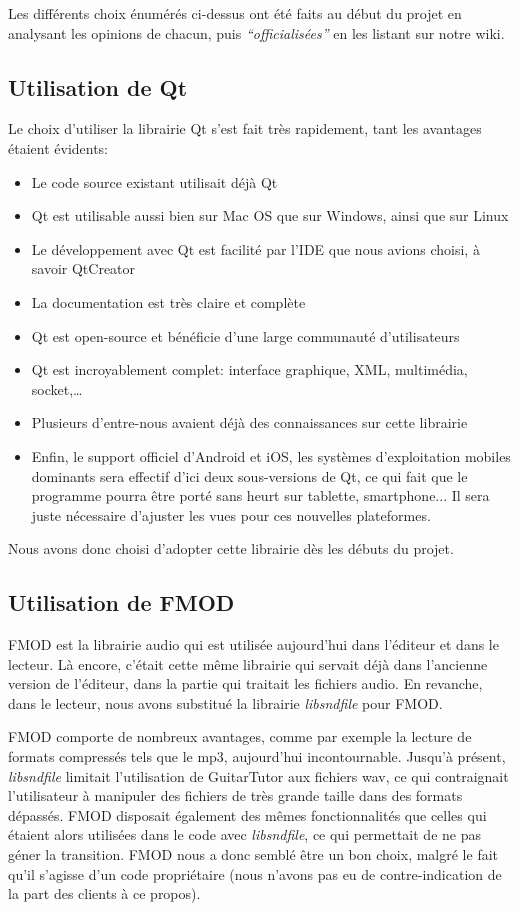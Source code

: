 \documentclass[a4paper,11pt]{article}
\begin{document}
Les différents choix énumérés ci-dessus ont été faits au début du projet en analysant les opinions de chacun, puis \textit{``officialisées''} en les listant sur notre wiki.


\subsection{Utilisation de Qt}

Le choix d'utiliser la librairie Qt s'est fait très rapidement, tant les avantages étaient évidents:
\begin{itemize}
 \item Le code source existant utilisait déjà Qt
 \item Qt est utilisable aussi bien sur Mac OS que sur Windows, ainsi que sur Linux
 \item Le développement avec Qt est facilité par l'IDE que nous avions choisi, à savoir QtCreator
 \item La documentation est très claire et complète
 \item Qt est open-source et bénéficie d'une large communauté d'utilisateurs
 \item Qt est incroyablement complet: interface graphique, XML, multimédia, socket,\dots
 \item Plusieurs d'entre-nous avaient déjà des connaissances sur cette librairie
 \item Enfin, le support officiel d'Android et iOS, les systèmes d'exploitation mobiles dominants sera effectif d'ici deux sous-versions de Qt,
 ce qui fait que le programme pourra être porté sans heurt sur tablette, smartphone... Il sera juste nécessaire d'ajuster les vues pour
 ces nouvelles plateformes.
\end{itemize}

Nous avons donc choisi d'adopter cette librairie dès les débuts du projet.

\subsection{Utilisation de FMOD}

FMOD est la librairie audio qui est utilisée aujourd'hui dans l'éditeur et dans le lecteur. Là encore, c'était cette même librairie qui servait déjà dans l'ancienne version de l'éditeur, dans la partie qui traitait les fichiers audio. En revanche, dans le lecteur, nous avons substitué la librairie \textit{libsndfile} pour FMOD.

FMOD comporte de nombreux avantages, comme par exemple la lecture de formats compressés tels que le mp3, aujourd'hui incontournable. Jusqu'à présent, \textit{libsndfile} limitait l'utilisation de GuitarTutor aux fichiers wav, ce qui contraignait l'utilisateur à manipuler des fichiers de très grande taille dans des formats dépassés. FMOD disposait également des mêmes fonctionnalités que celles qui étaient alors utilisées dans le code avec \textit{libsndfile}, ce qui permettait de ne pas géner la transition. FMOD nous a donc semblé être un bon choix, malgré le fait qu'il s'agisse d'un code propriétaire (nous n'avons pas eu de contre-indication de la part des clients à ce propos).
\end{document}
